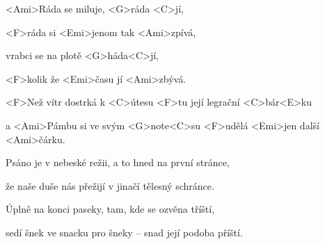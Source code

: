 

\zr
<Ami>Ráda se miluje, <G>ráda <C>jí,

<F>ráda si <Emi>jenom tak <Ami>zpívá,

vrabci se na plotě <G>háda<C>jí,

<F>kolik že <Emi>času jí <Ami>zbývá.
\kr

\zs
<F>Než vítr dostrká k <C>útesu <F>tu její legrační 
<C>bár<E>ku

a <Ami>Pámbu si ve svým <G>note<C>su <F>udělá <Emi>jen další <Ami>čárku.
\ks

\zr \kr

\zs
Psáno je v nebeské režii, a to hned na první stránce,

že naše duše nás přežijí v jinačí tělesný schránce.
\ks

\zr \kr

\zs
Úplně na konci paseky, tam, kde se ozvěna tříští,

sedí šnek ve snacku pro šneky -- snad její podoba příští. \ks

\zr \kr

\kp
